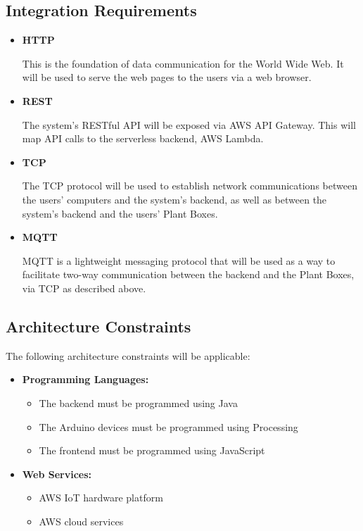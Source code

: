 \documentclass{article}
\begin{document}
\subsection{Integration Requirements}
\begin{itemize}
	\item \textbf{HTTP}
	
	This is the foundation of data communication for the World Wide Web. It will be used to serve the web pages to the users via a web browser.	
	\item \textbf{REST}
	
	The system's RESTful API will be exposed via AWS API Gateway. This will map API calls to the serverless backend, AWS Lambda.
	\item \textbf{TCP}
	
	The TCP protocol will be used to establish network communications between the users' computers and the system's backend, as well as between the system's backend and the users' Plant Boxes.
	\item \textbf{MQTT}
	
	MQTT is a lightweight messaging protocol that will be used as a way to facilitate two-way communication between the backend and the Plant Boxes, via TCP as described above.  
	
\end{itemize}

\subsection{Architecture Constraints}
	The following architecture constraints will be applicable:
		\begin{itemize}
			\item \textbf{Programming Languages:}
			\begin{itemize}
				\item The backend must be programmed using Java
				\item The Arduino devices must be programmed using Processing
				\item The frontend must be programmed using JavaScript
			\end{itemize}
			\item \textbf{Web Services:}
			\begin{itemize}
				\item AWS IoT hardware platform
				\item AWS cloud services
			\end{itemize}
		\end{itemize}
\end{document}
